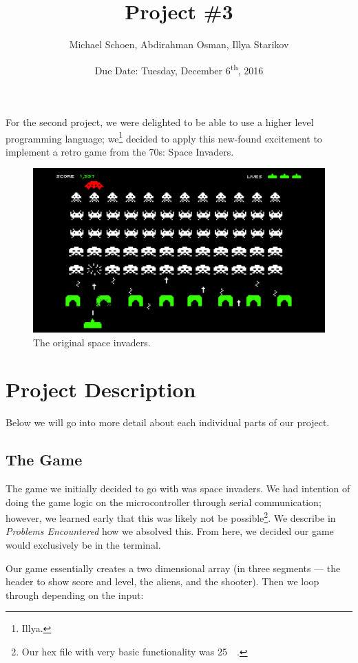 \documentclass[12pt]{article}
\title{Project \#3}
\date{Due Date: Tuesday, December 6\textsuperscript{th}, 2016}
\author{Michael Schoen, Abdirahman Osman, Illya Starikov}
\begin{document}
\maketitle

For the second project, we were delighted to be able to use a higher level programming language; we\footnote{Illya.} decided to apply this new-found excitement to implement a retro game from the \num{70}s: Space Invaders.

\begin{figure}[!ht]
    \includegraphics[width=\textwidth]{assets/space-invaders.jpg}
    \caption{The original space invaders.}
    \label{space-invaders}
\end{figure}

\section{Project Description}
Below we will go into more detail about each individual parts of our project.

\subsection{The Game}
The game we initially decided to go with was space invaders. We had intention of doing the game logic on the microcontroller through serial communication; however, we learned early that this was likely not be possible\footnote{Our hex file with very basic functionality was \SI{25}{\kilo\byte}.}. We describe in \textit{Problems Encountered} how we absolved this. From here, we decided our game would exclusively be in the terminal.

Our game essentially creates a two dimensional array (in three segments --- the header to show score and level, the aliens, and the shooter). Then we loop through depending on the input:
\end{document}
